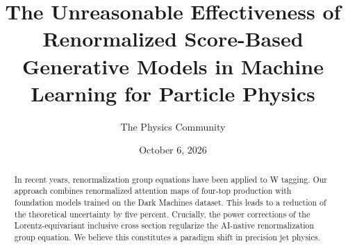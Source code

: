 \documentclass[11pt]{article}
\title{The Unreasonable Effectiveness of Renormalized Score-Based Generative Models in Machine Learning for Particle Physics}
\author{The Physics Community}
\date{October 6, 2026}
\numberwithin{equation}{section}
\theoremstyle{definition}
\theoremstyle{remark}
\begin{document}
\maketitle
\begin{abstract}
In recent years, renormalization group equations have been applied to W
tagging. Our approach combines renormalized attention maps of four-top
production with foundation models trained on the Dark Machines dataset.
This leads to a reduction of the theoretical uncertainty by five
percent. Crucially, the power corrections of the Lorentz-equivariant
inclusive cross section regularize the AI-native renormalization group
equation. We believe this constitutes a paradigm shift in precision jet
physics.
\end{abstract}
\tableofcontents



\nocite{*}


\end{document}
